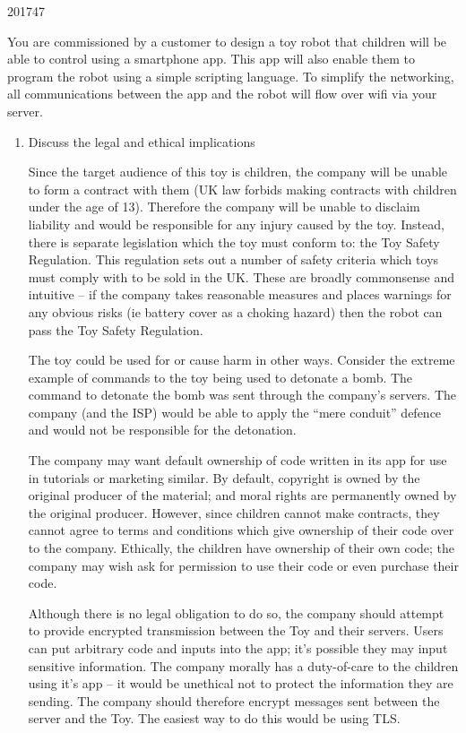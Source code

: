 \documentclass[10pt,\jkfside,a4paper]{article}
\begin{document}
\begin{examquestion}{2017}{4}{7}

You are commissioned by a customer to design a toy robot that children will
be able to control using a smartphone app. This app will also enable them to
program the robot using a simple scripting language. To simplify the
networking, all communications between the app and the robot will flow over
wifi via your server.

\begin{enumerate}[label=(\alph*)]

\item Discuss the legal and ethical implications

Since the target audience of this toy is children, the company will be
unable to form a contract with them (UK law forbids making contracts with
children under the age of 13). Therefore the company will be unable to
disclaim liability and would be responsible for any injury caused by the toy.
Instead, there is separate legislation which the toy must conform to: the
Toy Safety Regulation. This regulation sets out a number of safety criteria
which toys must comply with to be sold in the UK\@. These are
broadly commonsense and intuitive -- if the company takes reasonable
measures and places warnings for any obvious risks (ie battery cover as a
choking hazard) then the robot can pass the Toy Safety Regulation.

The toy could be used for or cause harm in other ways. Consider the extreme
example of commands to the toy being used to detonate a bomb. The command to
detonate the bomb was sent through the company's servers. The company (and
the ISP) would be able to apply the ``mere conduit'' defence and would not
be responsible for the detonation.

The company may want default ownership of code written in its app for use in
tutorials or marketing similar. By default, copyright is owned by
the original producer of the material; and moral rights are permanently
owned by the original producer. However, since children cannot make
contracts, they cannot agree to terms and conditions which give ownership
of their code over to the company. Ethically, the children have ownership of
their own code; the company may wish ask for permission to use their code or
even purchase their code.

Although there is no legal obligation to do so, the company should attempt
to provide encrypted transmission between the Toy and their servers. Users
can put arbitrary code and inputs into the app; it's possible they may
input sensitive information. The company morally has a duty-of-care to the
children using it's app -- it would be unethical not to protect the
information they are sending. The company should therefore encrypt messages
sent between the server and the Toy. The easiest way to do this would be using
TLS\@.


\end{enumerate}
\end{examquestion}
\end{document}
